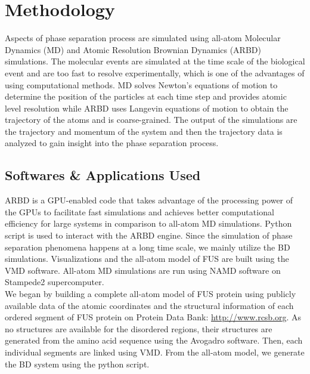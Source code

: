 \documentclass[12ptr]{article}
\begin{document}
\section{Methodology}
Aspects of phase separation process are simulated using all-atom Molecular Dynamics (MD) and Atomic Resolution Brownian Dynamics (ARBD) simulations. The molecular events are simulated at the time scale of the biological event and are too fast to resolve experimentally, which is one of the advantages of using computational methods. MD solves Newton’s equations of motion to determine the position of the particles at each time step and provides atomic level resolution while ARBD uses Langevin equations of motion to obtain the trajectory of the atoms and is coarse-grained. The output of the simulations are the trajectory and momentum of the system and then the trajectory data is analyzed to gain insight into the phase separation process. \\

\subsection{Softwares \& Applications Used}
ARBD is a GPU-enabled code that takes advantage of the processing power of the GPUs to facilitate fast simulations and achieves better computational efficiency for large systems in comparison to all-atom MD simulations. Python script is used to interact with the ARBD engine. Since the simulation of phase separation phenomena happens at a long time scale, we mainly utilize the BD simulations.
Visualizations and the all-atom model of FUS are built using the VMD software.
All-atom MD simulations are run using NAMD software on Stampede2 supercomputer.\\

We began by building a complete all-atom model of FUS protein using publicly available data of the atomic coordinates and the structural information of each ordered segment of FUS protein on Protein Data Bank: \href {http://www.rcsb.org}{http://www.rcsb.org}. As no structures are available for the disordered regions, their structures are generated from the amino acid sequence using the Avogadro software. Then, each individual segments are linked using VMD. From the all-atom model, we generate the BD system using the python script. 
\end{document}
